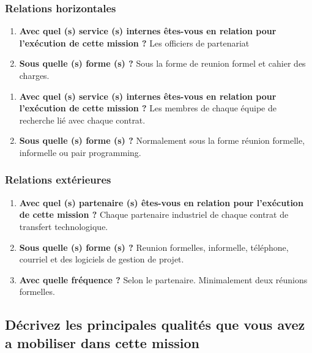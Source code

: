 \documentclass{resume} %
\begin{document}
	\subsubsection {Relations horizontales } 
	
	\begin{enumerate}
		\item \textbf{ Avec quel (s) service (s) internes êtes-vous en relation pour l'exécution de cette mission ?}
			Les officiers de partenariat  
		\item \textbf{Sous quelle (s) forme (s) ?}
			Sous la forme de reunion formel et cahier des charges. 
	\end {enumerate}
	\begin{enumerate}
		\item \textbf{ Avec quel (s) service (s) internes êtes-vous en relation pour l'exécution de cette mission ?}
			Les membres de chaque équipe de recherche lié avec chaque contrat.
		\item \textbf{Sous quelle (s) forme (s) ?}
			Normalement sous la forme réunion formelle, informelle ou pair programming. 
	\end {enumerate}	

	\subsubsection {Relations extérieures}
		\begin{enumerate}
		\item \textbf{Avec quel (s) partenaire (s) êtes-vous en relation pour l'exécution de cette mission ?}
			Chaque partenaire industriel de chaque contrat de transfert technologique.
		\item \textbf{ Sous quelle (s) forme (s) ?}
			Reunion formelles, informelle, téléphone, courriel et des logiciels de gestion de projet.
		\item \textbf{ Avec quelle fréquence ?}
			Selon le partenaire. Minimalement deux réunions formelles. 
		\end {enumerate}			


	\subsection{Décrivez les principales qualités que vous avez a mobiliser dans cette mission}
			
\end{document}

